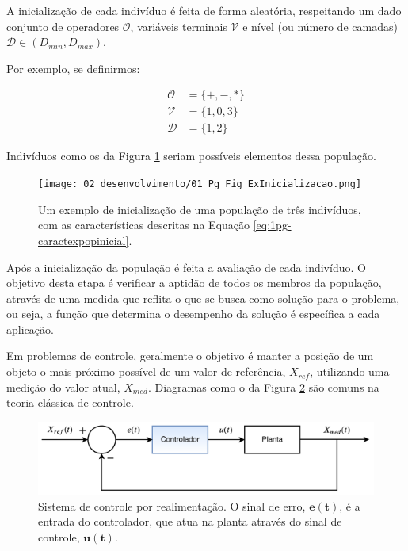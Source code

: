 A inicialização de cada indivíduo é feita de forma aleatória, respeitando um dado conjunto de operadores $\mathcal{O}$, variáveis terminais $\mathcal{V}$ e nível (ou número de camadas) $\mathcal{D} \in (D_{min}, D_{max})$.

Por exemplo, se definirmos:

\begin{align}
\label{eq:1pg-caractexpopinicial}
\mathcal{O} &= \{+, -, *\} \nonumber\\
\mathcal{V} &= \{1, 0, 3\}\\
\mathcal{D} &= \{1, 2\} \nonumber
\end{align}

Indivíduos como os da Figura \ref{fig:1pg-expopinicial} seriam possíveis elementos dessa população.

\begin{figure}[!htb]
\centering
\texttt{[image: 02\_desenvolvimento/01\_Pg\_Fig\_ExInicializacao.png]}
\caption{Um exemplo de inicialização de uma população de três indivíduos, com as características descritas na Equação \ref{eq:1pg-caractexpopinicial}.}\label{fig:1pg-expopinicial}
\end{figure}

Após a inicialização da população é feita a avaliação de cada indivíduo. O objetivo desta etapa é verificar a aptidão de todos os membros da população, através de uma medida que reflita o que se busca como solução para o problema, ou seja, a função que determina o desempenho da solução é específica a cada aplicação.

Em problemas de controle, geralmente o objetivo é manter a posição de um objeto o mais próximo possível de um valor de referência, $X_{ref}$, utilizando uma medição do valor atual, $X_{med}$. Diagramas como o da Figura \ref{fig:1pg-malhacontroleclassico} são comuns na teoria clássica de controle.

\begin{figure}[H]
	\centering
	\includegraphics[width=0.85\linewidth]{02_desenvolvimento/01_Pg_Fig_MalhaControleClassico.pdf}
	\caption{Sistema de controle por realimentação. O sinal de erro, $\bm{e(t)}$, é a entrada do controlador, que atua na planta através do sinal de controle, $\bm{u(t)}$.}
	\label{fig:1pg-malhacontroleclassico}
\end{figure}

